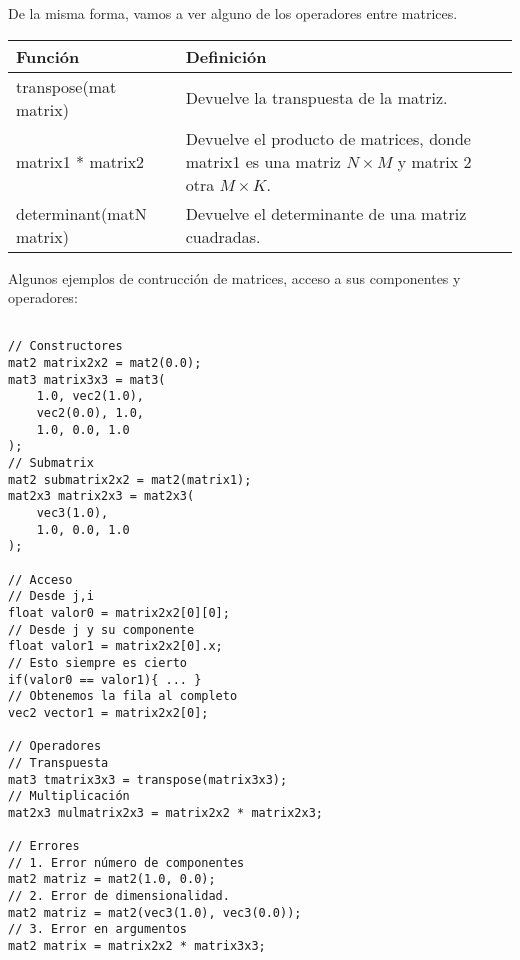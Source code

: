 De la misma forma, vamos a ver alguno de los operadores entre matrices.
\begin{table}[H]
    \begin{tabularx}{\textwidth}{l|X}
      \toprule
      Función & Definición\\
      \midrule
      transpose(mat matrix) & Devuelve la transpuesta de la matriz.\\
      matrix1 * matrix2 & Devuelve el producto de matrices, donde matrix1 es una matriz \(N\times M\) y matrix 2 otra \(M\times K\). \\
      determinant(matN matrix) & Devuelve el determinante de una matriz cuadradas. \\
      \bottomrule
    \end{tabularx}
\end{table}
Algunos ejemplos de contrucción de matrices, acceso a sus componentes y operadores:
\begin{lstlisting}

// Constructores
mat2 matrix2x2 = mat2(0.0);
mat3 matrix3x3 = mat3(
    1.0, vec2(1.0),
    vec2(0.0), 1.0,
    1.0, 0.0, 1.0
);
// Submatrix
mat2 submatrix2x2 = mat2(matrix1);
mat2x3 matrix2x3 = mat2x3(
    vec3(1.0),
    1.0, 0.0, 1.0
);

// Acceso
// Desde j,i
float valor0 = matrix2x2[0][0];
// Desde j y su componente
float valor1 = matrix2x2[0].x;
// Esto siempre es cierto
if(valor0 == valor1){ ... }
// Obtenemos la fila al completo
vec2 vector1 = matrix2x2[0];

// Operadores
// Transpuesta
mat3 tmatrix3x3 = transpose(matrix3x3);
// Multiplicación
mat2x3 mulmatrix2x3 = matrix2x2 * matrix2x3;

// Errores
// 1. Error número de componentes
mat2 matriz = mat2(1.0, 0.0);
// 2. Error de dimensionalidad.
mat2 matriz = mat2(vec3(1.0), vec3(0.0));
// 3. Error en argumentos
mat2 matrix = matrix2x2 * matrix3x3;
\end{lstlisting}
